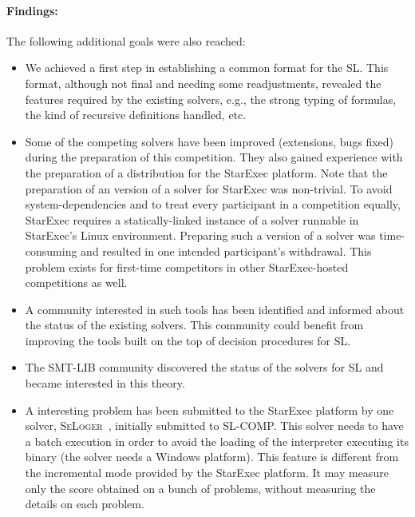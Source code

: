 \documentclass{llncs}
\begin{document}
\paragraph{Findings:}
The following additional goals were also reached:
\begin{itemize}
\item We achieved a first step in establishing a common format for the SL. 
This format, although not final and needing some readjustments, revealed the features required by the existing solvers, e.g., the strong typing of formulas, the kind of recursive definitions handled, etc.

\item Some of the competing solvers have been improved (extensions, bugs fixed) during the preparation of this competition. They also gained experience with the preparation of a distribution for the StarExec platform. Note that the preparation of an version of a solver for StarExec was non-trivial. To avoid system-dependencies and to treat every participant in a competition equally, StarExec requires a 
statically-linked instance of a solver runnable in StarExec's Linux environment. Preparing such a version
of a solver was time-consuming and resulted in one intended participant's withdrawal. This problem
exists for first-time competitors in other StarExec-hosted competitions as well.

\item A community interested in such tools has been identified and informed about the status of the existing solvers. This community could benefit from improving the tools built on the top of decision procedures for SL.

\item The SMT-LIB community discovered the status of the solvers for SL and became interested in this theory.

\item A interesting problem has been submitted to the StarExec platform by one solver, \textsc{SeLoger}~\cite{HasseIOP13}, initially submitted to SL-COMP. This solver needs to have a batch execution in order to avoid the loading of the interpreter executing its binary (the solver needs a Windows platform).
This feature is different from the incremental mode provided by the StarExec platform. It may measure only the score obtained on a bunch of problems, without measuring the details on each problem. 
 
\end{itemize}
\end{document}
